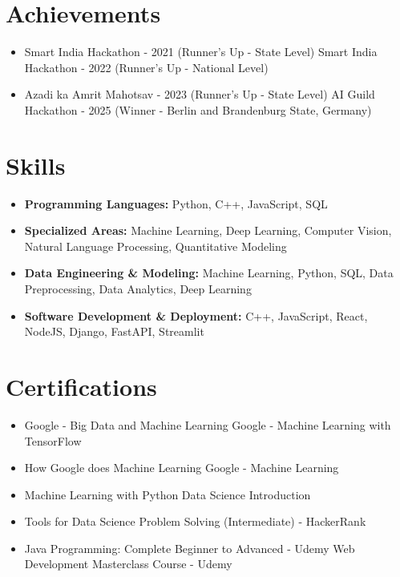 \documentclass[a4paper,10pt]{article}
\begin{document}
\section*{Achievements}
\begin{itemize}
\item Smart India Hackathon - 2021 (Runner's Up - State Level) \hfill Smart India Hackathon - 2022 (Runner's Up - National Level)
\item Azadi ka Amrit Mahotsav - 2023 (Runner's Up - State Level) \hfill AI Guild Hackathon - 2025 (Winner - Berlin and Brandenburg State, Germany)
\end{itemize}

\section*{Skills}
\begin{itemize}
  \item \textbf{Programming Languages:} Python, C++, JavaScript, SQL
  \item \textbf{Specialized Areas:} Machine Learning, Deep Learning, Computer Vision, Natural Language Processing, Quantitative Modeling
  \item \textbf{Data Engineering \& Modeling:} Machine Learning, Python, SQL, Data Preprocessing, Data Analytics, Deep Learning
  \item \textbf{Software Development \& Deployment:} C++, JavaScript, React, NodeJS, Django, FastAPI, Streamlit
\end{itemize}

\section*{Certifications}
\begin{itemize}
\item Google - Big Data and Machine Learning \hfill Google - Machine Learning with TensorFlow
\item How Google does Machine Learning \hfill Google - Machine Learning
\item Machine Learning with Python \hfill Data Science Introduction
\item Tools for Data Science \hfill Problem Solving (Intermediate) - HackerRank
\item Java Programming: Complete Beginner to Advanced - Udemy \hfill Web Development Masterclass Course - Udemy
\end{itemize}
\end{document}
